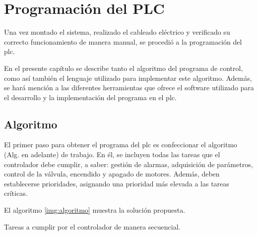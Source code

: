 \chapter{Programación del PLC}
\label{ch:progPLC}

Una vez montado el sistema, realizado el cableado eléctrico y verificado su
correcto funcionamiento de
manera manual, se procedió a la programación del \gls{plc}.

En el presente capítulo se describe tanto el algoritmo del programa de control,
como así también el lenguaje utilizado para implementar este algoritmo.
Además, se hará mención a las diferentes herramientas que ofrece el software
utilizado para el desarrollo y la implementación del programa en el \gls{plc}.

\section{Algoritmo}
\label{sec:Algoritmo}
El primer paso para obtener el programa del \gls{plc} es
confeccionar el algoritmo (Alg. en adelante) de trabajo.
En él, se incluyen todas las tareas que el
controlador debe cumplir, a saber: gestión de alarmas, adquisición de
parámetros, control de la válvula, encendido y apagado de motores.
Además, deben establecerse prioridades,
asignando una prioridad más elevada a las tareas críticas.

El algoritmo \ref{img:algoritmo} muestra la solución propuesta.

\begin{algorithm}[!ht]
 \small
 \caption{Tareas a cumplir por el controlador de manera secuencial.}
 \label{img:algoritmo}
\end{algorithm}

